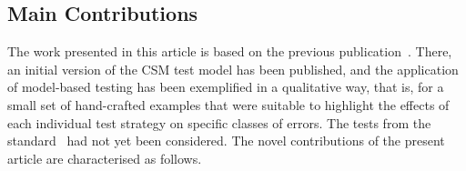 
\subsection{Main Contributions}
The work presented in this article is based on the previous 
publication~\cite{peleska_csm_2014}.
There, an initial version of the CSM test model has been published, 
and the application of model-based testing has been exemplified  in a qualitative 
way, that is, for a small set of hand-crafted examples that were suitable to highlight
the effects of each individual test strategy on specific classes of errors. The
tests from the standard~\cite{ETCS-Subset076} had not yet been considered.
 The novel contributions of the present article are characterised  as follows.

